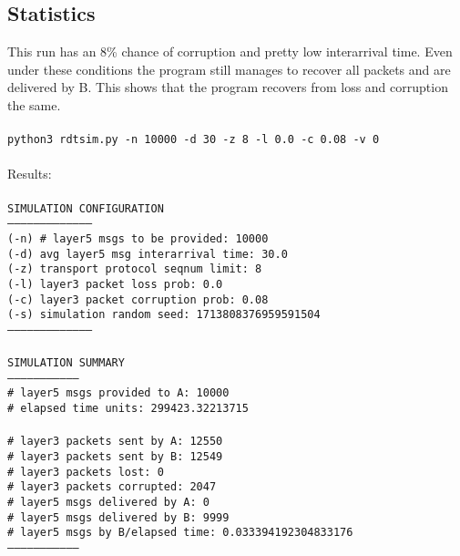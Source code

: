 \documentclass{article}
\begin{document}
\subsection{Statistics}
This run has an 8\% chance of corruption and pretty low interarrival time. Even
under these conditions the program still manages to recover all packets and are
delivered by B. This shows that the program recovers from loss and corruption the same.
\\\\
\hspace*{10mm} \texttt{python3 rdtsim.py -n 10000 -d 30 -z 8 -l 0.0 -c 0.08 -v 0}\\\\
Results: \\
\texttt{\\
SIMULATION CONFIGURATION\\
--------------------------------------\\
(-n) \# layer5 msgs to be provided:      10000\\
(-d) avg layer5 msg interarrival time:  30.0\\
(-z) transport protocol seqnum limit:   8\\
(-l) layer3 packet loss prob:           0.0\\
(-c) layer3 packet corruption prob:     0.08\\
(-s) simulation random seed:            1713808376959591504\\
--------------------------------------\\
\\
SIMULATION SUMMARY\\
--------------------------------\\
\# layer5 msgs provided to A:      10000\\
\# elapsed time units:             299423.32213715\\
\\
\# layer3 packets sent by A:       12550\\
\# layer3 packets sent by B:       12549\\
\# layer3 packets lost:            0\\
\# layer3 packets corrupted:       2047\\
\# layer5 msgs delivered by A:     0\\
\# layer5 msgs delivered by B:     9999\\
\# layer5 msgs by B/elapsed time:  0.033394192304833176\\
--------------------------------\\}
\end{document}
